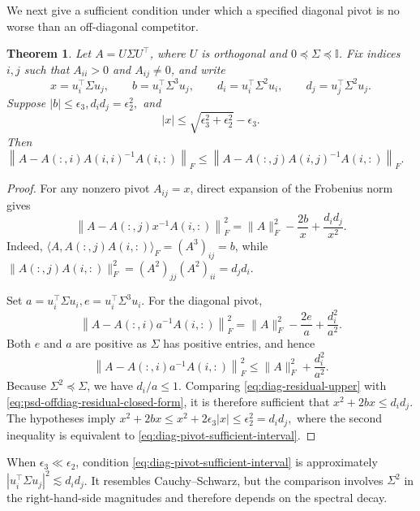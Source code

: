\documentclass[11pt, preprint]{article}
\newtheorem{theorem}{Theorem}[section]
\newcommand{\inner}[1]{\langle #1\rangle}
\begin{document}
We next give a sufficient condition under which a specified diagonal pivot is no worse than an off-diagonal competitor.

\begin{theorem} \label{thm:diag_pivoting_spd}
Let $A=U\Sigma U^\top$, where $U$ is orthogonal and
$0\preceq\Sigma\preceq \mathbb{I}$. Fix indices $i,j$ such that
$A_{ii}> 0$ and $A_{ij}\neq0$, and write
\[x=u_i^\top\Sigma u_j,\qquad b=u_i^\top\Sigma^3u_j, \qquad d_i=u_i^\top\Sigma^2u_i, \qquad d_j=u_j^\top\Sigma^2u_j.\]
Suppose
\( |b|\leq\epsilon_3, d_id_j=\epsilon_2^2,\)
and
\begin{equation}\label{eq:diag-pivot-sufficient-interval}
|x|\leq\sqrt{\epsilon_3^2+\epsilon_2^2}-\epsilon_3.
\end{equation}
Then
\(\left\|A-A(:,i)A(i,i)^{-1}A(i,:)\right\|_F \leq\left\|A-A(:,j)A(i,j)^{-1}A(i,:)\right\|_F.
\)
\end{theorem}

\begin{proof}
For any nonzero pivot $A_{ij}=x$, direct expansion of the Frobenius norm gives
\begin{equation}\label{eq:psd-offdiag-residual-closed-form}
\left\|A-A(:,j)x^{-1}A(i,:)\right\|_F^2
=
\|A\|_F^2-\frac{2b}{x}+\frac{d_id_j}{x^2}.
\end{equation}
Indeed,
$\inner{A,A(:,j)A(i,:)}_F=(A^3)_{ij}=b$, while
$\|A(:,j)A(i,:)\|_F^2=(A^2)_{jj}(A^2)_{ii}=d_jd_i$.

Set
\(
a=u_i^\top\Sigma u_i, e=u_i^\top\Sigma^3u_i.
\)
For the diagonal pivot,
\[
\left\|A-A(:,i)a^{-1}A(i,:)\right\|_F^2
=
\|A\|_F^2-\frac{2e}{a}+\frac{d_i^2}{a^2}.
\]
Both $e$ and $a$ are positive as $\Sigma$ has positive entries, and hence
\begin{equation}\label{eq:diag-residual-upper}
\left\|A-A(:,i)a^{-1}A(i,:)\right\|_F^2
\leq
\|A\|_F^2+\frac{d_i^2}{a^2}.
\end{equation}
Because $\Sigma^2\preceq\Sigma$, we have $d_i/a\leq1$. Comparing
\eqref{eq:diag-residual-upper} with \eqref{eq:psd-offdiag-residual-closed-form}, it is therefore sufficient that \(x^2+2bx\leq d_id_j. \)
The hypotheses imply \(x^2+2bx\leq x^2+2\epsilon_3|x|\leq\epsilon_2^2=d_id_j,\) 
where the second inequality is equivalent to \eqref{eq:diag-pivot-sufficient-interval}.
\end{proof}

When $\epsilon_3\ll\epsilon_2$, condition \eqref{eq:diag-pivot-sufficient-interval} is approximately
$|u_i^\top\Sigma u_j|^2\lesssim d_id_j$. It resembles Cauchy--Schwarz, but the comparison involves $\Sigma^2$ in the right-hand-side magnitudes and therefore depends on the spectral decay.
\end{document}
